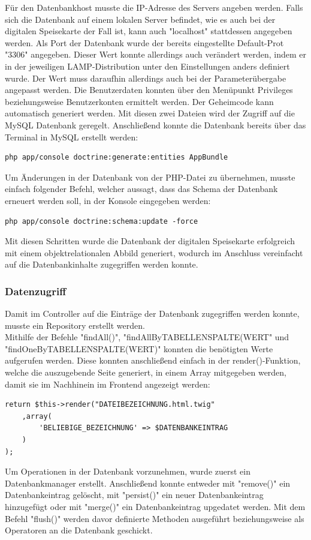Für den Datenbankhost musste die IP-Adresse des Servers angeben werden. Falls sich die Datenbank auf einem lokalen Server befindet, wie es auch bei der digitalen Speisekarte der Fall ist, kann auch "localhost" stattdessen angegeben werden. Als Port der Datenbank wurde der bereits eingestellte Default-Prot "3306" angegeben. Dieser Wert konnte allerdings auch verändert werden, indem er in der jeweiligen LAMP-Distribution unter den Einstellungen anders definiert wurde. Der Wert muss daraufhin allerdings auch bei der Parameterübergabe angepasst werden. Die Benutzerdaten konnten über den Menüpunkt Privileges beziehungsweise Benutzerkonten ermittelt werden. Der Geheimcode kann automatisch generiert werden.
Mit diesen zwei Dateien wird der Zugriff auf die MySQL Datenbank geregelt.
Anschließend konnte die Datenbank bereits über das Terminal in MySQL erstellt werden:
	\lstset{language = bash}
  	\begin{lstlisting}
php app/console doctrine:generate:entities AppBundle
  	\end{lstlisting}
Um Änderungen in der Datenbank von der PHP-Datei zu übernehmen, musste einfach folgender Befehl, welcher aussagt, dass das Schema der Datenbank erneuert werden soll, in der Konsole eingegeben werden:
	\lstset{language=php}
  	\begin{lstlisting}
php app/console doctrine:schema:update -force
  	\end{lstlisting}
Mit diesen Schritten wurde die Datenbank der digitalen Speisekarte erfolgreich mit einem objektrelationalen Abbild generiert, wodurch im Anschluss vereinfacht auf die Datenbankinhalte zugegriffen werden konnte.

    \subsubsection{Datenzugriff}

Damit im Controller auf die Einträge der Datenbank zugegriffen werden konnte, musste ein Repository erstellt werden.
\\
Mithilfe der Befehle "findAll()", "findAllByTABELLENSPALTE(WERT" und "findOneByTABELLENSPALTE(WERT)" konnten die benötigten Werte aufgerufen werden.
Diese konnten anschließend einfach in der render()-Funktion, welche die auszugebende Seite generiert, in einem Array mitgegeben werden, damit sie im Nachhinein im Frontend angezeigt werden:
	\lstset{language=php}
  	\begin{lstlisting}
return $this->render("DATEIBEZEICHNUNG.html.twig"
    ,array(
    	'BELIEBIGE_BEZEICHNUNG' => $DATENBANKEINTRAG
    )
);
  	\end{lstlisting}
Um Operationen in der Datenbank vorzunehmen, wurde zuerst ein Datenbankmanager erstellt. Anschließend konnte entweder mit "remove()" ein Datenbankeintrag gelöscht, mit "persist()" ein neuer Datenbankeintrag hinzugefügt oder mit "merge()" ein Datenbankeintrag upgedatet werden. Mit dem Befehl "flush()" werden davor definierte Methoden ausgeführt beziehungsweise als Operatoren an die Datenbank geschickt.
	

